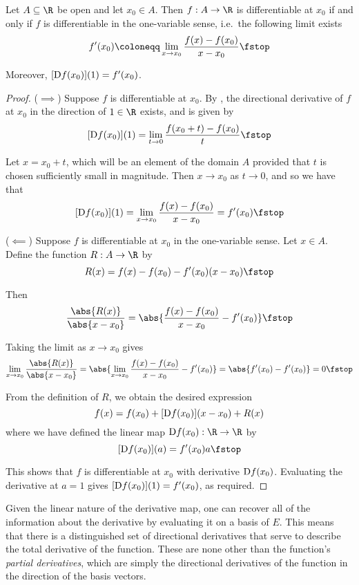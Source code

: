 \begin{proposition}
  Let \( A\subseteq\R \) be open and let \( x_0\in A \). Then \( f:A\to\R \) is differentiable at \( x_0 \) if and only if \( f \) is differentiable in the one-variable sense, i.e.\ the following limit exists
  \[ f'(x_0)\coloneqq\lim_{x\to x_0}\frac{f(x)-f(x_0)}{x-x_0}\fstop \]

  Moreover, \( [\text{D} f(x_0)](1)=f'(x_0) \).
\end{proposition}
\begin{proof}
  (\( \implies \)) Suppose \( f \) is differentiable at \( x_0 \). By , the directional derivative of \( f \) at \( x_0 \) in the direction of \( 1\in\R \) exists, and is given by
  \[ [\D f(x_0)](1)=\lim_{t\to 0}\frac{f(x_0+t)-f(x_0)}{t}\fstop \]

  Let \( x=x_0+t \), which will be an element of the domain \( A \) provided that \( t \) is chosen sufficiently small in magnitude. Then \( x\to x_0 \) as \( t\to 0 \), and so we have that
  \[ [\D f(x_0)](1)=\lim_{x\to x_0}\frac{f(x)-f(x_0)}{x-x_0}=f'(x_0)\fstop \]

  (\( \impliedby \)) Suppose \( f \) is differentiable at \( x_0 \) in the one-variable sense. Let \( x\in A \). Define the function \( R:A\to\R \) by
  \[ R(x)=f(x)-f(x_0)-f'(x_0)(x-x_0)\fstop \]

  Then
  \[ \frac{\abs{R(x)}}{\abs{x-x_0}}=\abs{\frac{f(x)-f(x_0)}{x-x_0}-f'(x_0)}\fstop \]

  Taking the limit as \( x\to x_0 \) gives
  \[ \lim_{x\to x_0}\frac{\abs{R(x)}}{\abs{x-x_0}}=\abs{\lim_{x\to x_0}\frac{f(x)-f(x_0)}{x-x_0}-f'(x_0)}=\abs{f'(x_0)-f'(x_0)}=0\fstop \]

  From the definition of \( R \), we obtain the desired expression
  \[ f(x)=f(x_0)+[\text{D} f(x_0)](x-x_0)+R(x) \]
  where we have defined the linear map \( \D f(x_0):\R\to \R \) by
  \[ [\D f(x_0)](a)=f'(x_0)a\fstop \]

  This shows that \( f \) is differentiable at \( x_0 \) with derivative \( \text{D} f(x_0) \). Evaluating the derivative at \( a=1 \) gives \( [\text{D} f(x_0)](1)=f'(x_0) \), as required.
\end{proof}

Given the linear nature of the derivative map, one can recover all of the information about the derivative by evaluating it on a basis of \( E \). This means that there is a distinguished set of directional derivatives that serve to describe the total derivative of the function. These are none other than the function's \emph{partial derivatives}, which are simply the directional derivatives of the function in the direction of the basis vectors.

